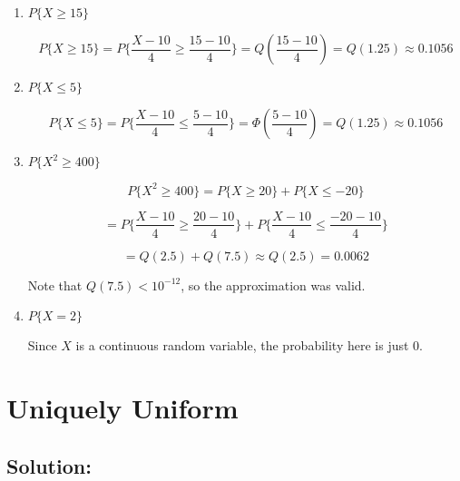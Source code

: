\documentclass{article}
\begin{document}
\begin{enumerate}[label=(\alph*)]
    \item $P\{X \geq 15\}$

    $$P\{X \geq 15\} = P\Biggl\{ \frac{X - 10}{4} \geq \frac{15 - 10}{4}\Biggr\} = Q\left(\frac{15-10}{4}\right) = Q(1.25) \approx \boxed{0.1056}$$

    \vspace{2cm}
    
    \item $P\{X \leq 5\}$

    $$P\{X \leq 5\} = P\Biggl\{ \frac{X - 10}{4} \leq \frac{5 - 10}{4}\Biggr\} = \Phi\left(\frac{5-10}{4}\right) = Q(1.25) \approx \boxed{0.1056}$$

    \vspace{2cm}
    
    \item $P\{X^2 \geq 400\}$

    $$P\{X^2 \geq 400\} = P\{X \geq 20\} + P\{X \leq -20\}$$

    $$= P\Biggl\{ \frac{X - 10}{4} \geq \frac{20 - 10}{4}\Biggr\} + P\Biggl\{ \frac{X - 10}{4} \leq \frac{-20 - 10}{4}\Biggr\}$$

    $$= Q(2.5) + Q(7.5) \approx Q(2.5) = \boxed{0.0062}$$

    Note that $Q(7.5) < 10^{-12}$, so the approximation was valid.

    \vspace{2cm}
    
    \item $P\{X = 2\}$

    Since $X$ is a continuous random variable, the probability here is just $\boxed{0}$.
\end{enumerate}

\newpage

\section{Uniquely Uniform}

\subsection{Solution:}
\end{document}
